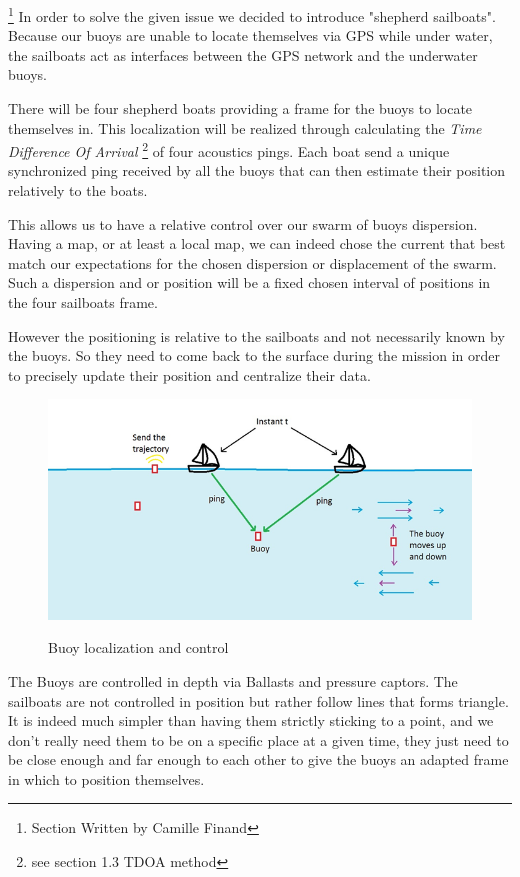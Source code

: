 \documentclass[a4paper]{report}
\begin{document}
\footnote{Section Written by Camille Finand}
In order to solve the given issue we decided to introduce "shepherd sailboats".
Because our buoys  are unable to locate themselves via GPS while under water, the sailboats act as interfaces between the GPS network and the underwater buoys.

There will be four shepherd boats providing a frame for the buoys to locate themselves in.
This localization will be realized through calculating the \emph{Time Difference Of Arrival} \footnote{see section 1.3 TDOA method} of four acoustics pings.
Each boat send a unique synchronized ping received by all the buoys that can then estimate their position relatively to the boats.

This allows us to have a relative control over our swarm of buoys dispersion.
Having a map, or at least a local map, we can indeed chose the current that best match our expectations for the chosen dispersion or displacement of the swarm.
Such a dispersion and or position will be a fixed chosen interval of positions in the four sailboats frame.

However the positioning is relative to the sailboats and not necessarily known by the buoys. So they need to come back to the surface during the mission in order to precisely update their position and centralize their data.
\begin{figure}[H]
  \centering
  \includegraphics[scale = 0.9]{image/ProjectSchem.png}
  \label{ProjectSchem}
  \caption{Buoy localization and control}
\end{figure}

The Buoys are controlled in depth via Ballasts and pressure captors. The sailboats are not controlled in position but rather follow lines that forms triangle. It is indeed much simpler than having them strictly sticking to a point, and we don't really need them to be on a specific place at a given time, they just need to be close enough and far enough to each other to give the buoys an adapted frame in which to position themselves.
\end{document}
